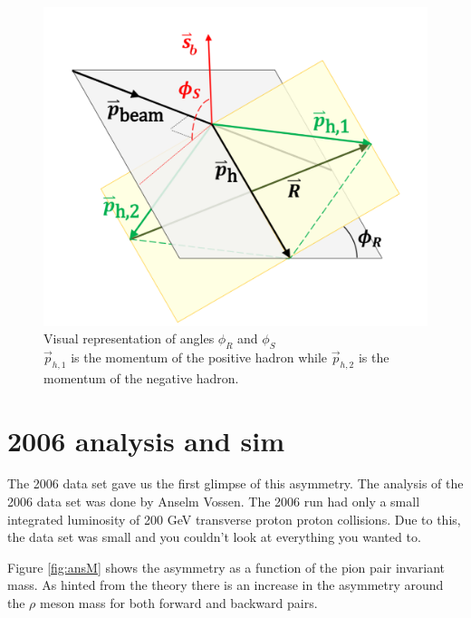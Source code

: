 \documentclass[abstract = on,listof=totoc, bibliography=totoc]{scrreprt}
\newcommand{\phir}{\phi_{R}}
\newcommand{\phis}{\phi_{S}}
\begin{document}
\begin{figure}
\begin{center}
\includegraphics[width = 1\textwidth]{IFF_frame_edit2}
\caption[Angles $\phis$ and $\phir$]{Visual representation of angles $\phi_R$ and $\phi_S$ \\ $\vec{p}_{h,1}$ is the momentum of the positive hadron while  $\vec{p}_{h,2}$ is the momentum of the negative hadron.}
\label{fig:angleDeff}
\end{center}
\end{figure}




\chapter{2006 analysis and sim}
\label{chap:2006}

The 2006 data set gave us the first glimpse of this asymmetry. The analysis of the 2006 data set was done by Anselm Vossen. The 2006 run had only a small integrated luminosity of 200 GeV transverse proton proton collisions. Due to this, the data set was small and you couldn't look at everything you wanted to. 


Figure \ref{fig:ansM} shows the asymmetry as a function of the pion pair invariant mass. As hinted from the theory there is an increase in the asymmetry around the $\rho$ meson mass for both forward and backward pairs. 
\end{document}
